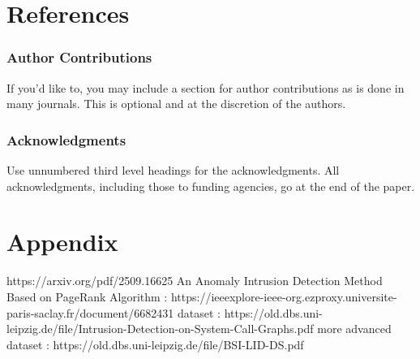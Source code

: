 \documentclass{article}
\begin{document}
\section{References}


\subsubsection*{Author Contributions}
If you'd like to, you may include  a section for author contributions as is done
in many journals. This is optional and at the discretion of the authors.

\subsubsection*{Acknowledgments}
Use unnumbered third level headings for the acknowledgments. All
acknowledgments, including those to funding agencies, go at the end of the paper.





\appendix
\section{Appendix}
https://arxiv.org/pdf/2509.16625
An Anomaly Intrusion Detection Method Based on PageRank Algorithm : https://ieeexplore-ieee-org.ezproxy.universite-paris-saclay.fr/document/6682431
dataset : https://old.dbs.uni-leipzig.de/file/Intrusion-Detection-on-System-Call-Graphs.pdf
more advanced dataset : https://old.dbs.uni-leipzig.de/file/BSI-LID-DS.pdf
\end{document}
